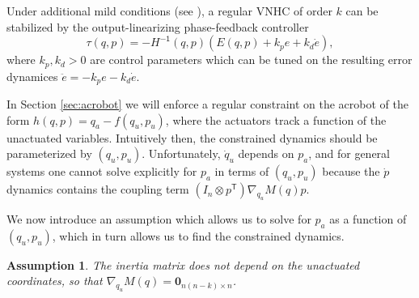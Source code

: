 \documentclass[journal,twoside,web]{ieeecolor}
\newtheorem{assm}{Assumption} %
\newcommand*{\tpose}{^\mathsf{T}}
\newcommand*{\inv}{^\mathsf{-1}}
\newcommand*{\Id}[1]{I_{#1}}
\newcommand*{\Zmat}[1]{\bm{0}_{#1}}
\begin{document}
Under additional mild conditions (see \cite{vhcs_for_el_systems}), a regular VNHC of
order \(k\) can be stabilized by the output-linearizing phase-feedback
controller
\begin{equation}
    \tau(q,p) = -H\inv(q,p)\left(E(q,p) + k_p e + k_d \dot{e}\right)
    ,
\end{equation}
where \(k_p, k_d > 0\) are control parameters which can be tuned on the
resulting error dynamices \(\ddot{e} = -k_p e - k_d \dot{e}\).

In Section \ref{sec:acrobot} we will enforce a regular constraint on the
acrobot of the form \(h(q,p) = q_a - f(q_u,p_u)\), where the actuators track a
function of the unactuated variables.
Intuitively then, the constrained dynamics should be parameterized by \((q_u, p_u)\).
Unfortunately, \(\dot{q}_u\) depends on \(p_a\), and for general systems one
cannot solve explicitly for \(p_a\) in terms of \((q_u,p_u)\) because
the \(\dot{p}\) dynamics contains the coupling term 
\((\Id{n} \otimes p\tpose)\nabla_{q_u}M(q)p\). 

We now introduce an assumption which allows us to solve for \(p_a\) as a
function of \((q_u,p_u)\), which in turn allows us to find the constrained
dynamics.

\begin{assm}\label{assm:inertially-actuated}
The inertia matrix does not depend on the unactuated coordinates, so that 
\(\nabla_{q_u}M(q) = \Zmat{n(n-k) \times n}\).
\end{assm}
\end{document}
